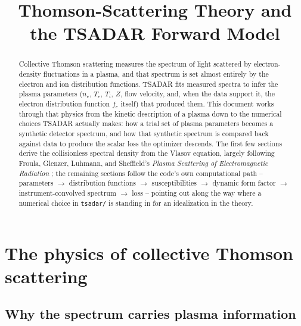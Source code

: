 \documentclass[11pt]{article}
\title{Thomson-Scattering Theory and the TSADAR Forward Model}
\author{}
\date{}
\newcommand{\file}[1]{\texttt{#1}}
\begin{document}
\maketitle

\begin{center}
\end{center}

\begin{abstract}
\noindent
Collective Thomson scattering measures the spectrum of light scattered by electron-density
fluctuations in a plasma, and that spectrum is set almost entirely by the electron and ion
distribution functions. TSADAR fits measured spectra to infer the plasma parameters
($n_e$, $T_e$, $T_i$, $Z$, flow velocity, and, when the data support it, the electron
distribution function $f_e$ itself) that produced them. This document works
through that physics from the kinetic description of a plasma down to the numerical
choices TSADAR actually makes: how a trial set of plasma parameters becomes a synthetic
detector spectrum, and how that synthetic spectrum is compared back against data to
produce the scalar loss the optimizer descends. The first few sections derive the
collisionless spectral density from the Vlasov equation, largely following Froula,
Glenzer, Luhmann, and Sheffield's \textit{Plasma Scattering of Electromagnetic Radiation}
\cite{sheffield2011}; the remaining
sections follow the code's own computational path -- parameters $\to$ distribution
functions $\to$ susceptibilities $\to$ dynamic form factor $\to$ instrument-convolved
spectrum $\to$ loss -- pointing out along the way where a numerical choice in
\file{tsadar/} is standing in for an idealization in the theory.
\end{abstract}

\tableofcontents

\section{The physics of collective Thomson scattering}\label{sec:physics}

\subsection{Why the spectrum carries plasma information}
\end{document}
